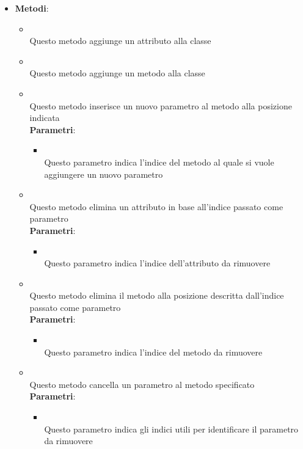 \begin{itemize}
\item \textbf{Metodi}:
\begin{itemize}
\item {}
\\ Questo metodo aggiunge un attributo alla classe
\item {}
\\ Questo metodo aggiunge un metodo alla classe
\item {}
\\ Questo metodo inserisce un nuovo parametro al metodo alla posizione indicata
\\ \textbf{Parametri}:
\begin{itemize}
\item {}
\\ Questo parametro indica l'indice del metodo al quale si vuole aggiungere un nuovo parametro
\end{itemize}
\item {}
\\ Questo metodo elimina un attributo in base all'indice passato come parametro
\\ \textbf{Parametri}:
\begin{itemize}
\item {}
\\ Questo parametro indica l'indice dell'attributo da rimuovere
\end{itemize}
\item {}
\\ Questo metodo elimina il metodo alla posizione descritta dall'indice passato come parametro
\\ \textbf{Parametri}:
\begin{itemize}
\item {}
\\ Questo parametro indica l'indice del metodo da rimuovere 
\end{itemize}
\item {}
\\ Questo metodo cancella un parametro al metodo specificato
\\ \textbf{Parametri}:
\begin{itemize}
\item {}
\\ Questo parametro indica gli indici utili per identificare il parametro da rimuovere
\end{itemize}
\end{itemize}
\end{itemize}


